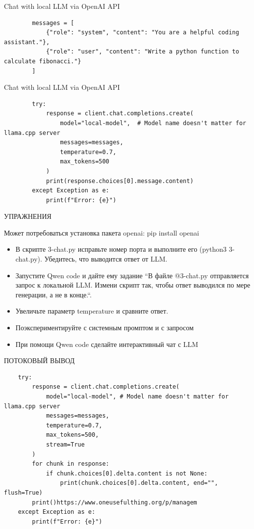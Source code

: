 \documentclass[aspectratio=169]{beamer}
\begin{document}
{\begin{frame}[fragile]{Chat with local LLM via OpenAI API}
\begin{verbatim}
        messages = [
            {"role": "system", "content": "You are a helpful coding assistant."},
            {"role": "user", "content": "Write a python function to calculate fibonacci."}
        ]
     \end{verbatim}
 
\end{frame}       
\begin{frame}[fragile]{Chat with local LLM via OpenAI API}
    
    \begin{verbatim}
        try:
            response = client.chat.completions.create(
                model="local-model",  # Model name doesn't matter for llama.cpp server
                messages=messages,
                temperature=0.7,
                max_tokens=500
            )
            print(response.choices[0].message.content)
        except Exception as e:
            print(f"Error: {e}")
    \end{verbatim}
    
\end{frame}
    
\begin{frame}{УПРАЖНЕНИЯ}
    
    Может потребоваться установка пакета openai: pip install openai
    \begin{itemize}
        \item [-] В скрипте 3-chat.py исправьте номер порта и выполните его (python3 3-chat.py). Убедитесь, что выводится ответ от LLM.         
        \item [-] Запустите Qwen code и дайте ему задание ``В файле @3-chat.py отправляется запрос к локальной LLM. Измени скрипт так, чтобы ответ выводился по мере генерации, а не в конце.``.
        \item [-] Увеличьте параметр temperature и сравните ответ.
        \item [-] Поэкспериментируйте с системным промптом и с запросом
        \item [-] При помощи Qwen code сделайте интерактивный чат с LLM
    \end{itemize}
    
     
\end{frame}

\begin{frame}[fragile]{ПОТОКОВЫЙ ВЫВОД}
      
    \begin{verbatim}
    try:
        response = client.chat.completions.create(
            model="local-model", # Model name doesn't matter for llama.cpp server
            messages=messages,
            temperature=0.7,
            max_tokens=500,
            stream=True
        )
        for chunk in response:
            if chunk.choices[0].delta.content is not None:
                print(chunk.choices[0].delta.content, end="", flush=True)
        print()https://www.oneusefulthing.org/p/managem
    except Exception as e:
        print(f"Error: {e}")    
        

\end{verbatim}
\end{frame}}
\end{document}
